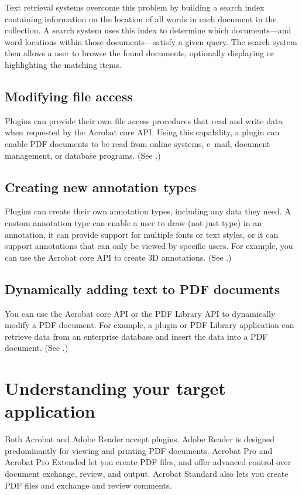 \documentclass[letterpaper,12pt,english,openany,oneside]{sphinxmanual}
\begin{document}
Text retrieval systems overcome this problem by building a search index containing information on the location of all words in each document in the collection. A search system uses this index to determine which documents—and word locations within those documents—satisfy a given query. The search system then allows a user to browse the found documents, optionally displaying or highlighting the matching items.


\subsection{Modifying file access}
\label{\detokenize{index:modifying-file-access}}
Plugins can provide their own file access procedures that read and write data when requested by the Acrobat core API. Using this capability, a plugin can enable PDF documents to be read from on\sphinxhyphen{}line systems, e–mail, document management, or database programs. (See .)


\subsection{Creating new annotation types}
\label{\detokenize{index:creating-new-annotation-types}}
Plugins can create their own annotation types, including any data they need. A custom annotation type can enable a user to draw (not just type) in an annotation, it can provide support for multiple fonts or text styles, or it can support annotations that can only be viewed by specific users. For example, you can use the Acrobat core API to create 3D annotations. (See .)


\subsection{Dynamically adding text to PDF documents}
\label{\detokenize{index:dynamically-adding-text-to-pdf-documents}}
You can use the Acrobat core API or the PDF Library API to dynamically modify a PDF document. For example, a plugin or PDF Library application can retrieve data from an enterprise database and insert the data into a PDF document. (See .)


\section{Understanding your target application}
\label{\detokenize{index:understanding-your-target-application}}
Both Acrobat and Adobe Reader accept plugins. Adobe Reader is designed predominantly for viewing and printing PDF documents. Acrobat Pro and Acrobat Pro Extended let you create PDF files, and offer advanced control over document exchange, review, and output. Acrobat Standard also lets you create PDF files and exchange and review comments.
\end{document}

